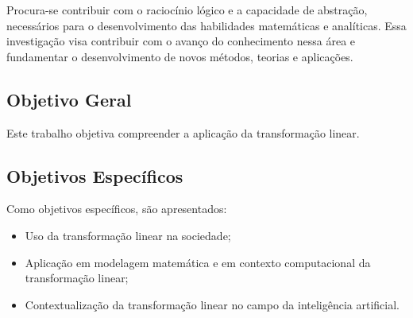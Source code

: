 Procura-se contribuir com o raciocínio lógico e a capacidade de abstração, necessários para o desenvolvimento das habilidades matemáticas e analíticas. Essa investigação visa contribuir com o avanço do conhecimento nessa área e fundamentar o desenvolvimento de novos métodos, teorias e aplicações.

\subsection{Objetivo Geral}
Este trabalho objetiva compreender a aplicação da transformação linear.

\subsection{Objetivos Específicos}
Como objetivos específicos, são apresentados:

\begin{itemize}
	\item Uso da transformação linear na sociedade;
	\item Aplicação em modelagem matemática e em contexto computacional da transformação linear;
	\item Contextualização da transformação linear no campo da inteligência artificial.
\end{itemize}
